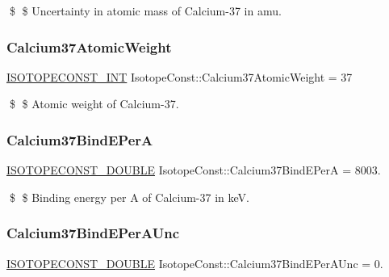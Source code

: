 \$ \$ Uncertainty in atomic mass of Calcium-\/37 in amu. \mbox{\label{group___isotope_const-_calcium-_ca37_ga560f961144adce3ae5ad65135f4017fa}} 
\subsubsection{\texorpdfstring{Calcium37\+Atomic\+Weight}{Calcium37AtomicWeight}}
{\footnotesize\ttfamily \mbox{\hyperlink{group___isotope_const-_macros_ga5f18360b3e99483a35c32d789e62621c}{I\+S\+O\+T\+O\+P\+E\+C\+O\+N\+S\+T\+\_\+\+I\+NT}} Isotope\+Const\+::\+Calcium37\+Atomic\+Weight = 37}

\$ \$ Atomic weight of Calcium-\/37. \mbox{\label{group___isotope_const-_calcium-_ca37_ga14738891b7d71483bb10b2818cf4365c}} 
\subsubsection{\texorpdfstring{Calcium37\+Bind\+E\+PerA}{Calcium37BindEPerA}}
{\footnotesize\ttfamily \mbox{\hyperlink{group___isotope_const-_macros_ga8f45a7272ce02c0b4c65c44636ed719a}{I\+S\+O\+T\+O\+P\+E\+C\+O\+N\+S\+T\+\_\+\+D\+O\+U\+B\+LE}} Isotope\+Const\+::\+Calcium37\+Bind\+E\+PerA = 8003.}

\$ \$ Binding energy per A of Calcium-\/37 in keV. \mbox{\label{group___isotope_const-_calcium-_ca37_gaa3ae8bcf274d1a897f75f3f0e24e7789}} 
\subsubsection{\texorpdfstring{Calcium37\+Bind\+E\+Per\+A\+Unc}{Calcium37BindEPerAUnc}}
{\footnotesize\ttfamily \mbox{\hyperlink{group___isotope_const-_macros_ga8f45a7272ce02c0b4c65c44636ed719a}{I\+S\+O\+T\+O\+P\+E\+C\+O\+N\+S\+T\+\_\+\+D\+O\+U\+B\+LE}} Isotope\+Const\+::\+Calcium37\+Bind\+E\+Per\+A\+Unc = 0.}

